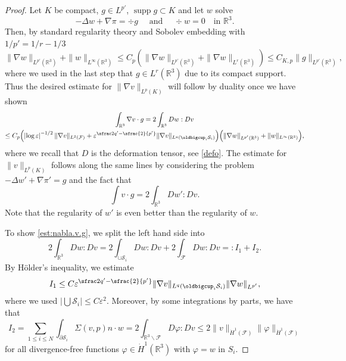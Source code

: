 \documentclass[JEP,XML,SOM,Unicode, NoEqCountersInSection,NoFloatCountersInSection,published]{cedram}
\newcommand{\R}{\mathbb{R}}
\let\eps\varepsilon
\newcommand{\cS}{\mathcal{S}}
\DeclareMathOperator{\supp}{supp}
\theoremstyle{definition}
\theoremstyle{remark}
\begin{document}
\begin{proof}

Let $K$ be compact, $g \in L^{p'}$, $\supp g \subset K$ and let $w$ solve
\begin{equation*}
- \Delta w + \nabla \pi = \div g \quad \text{ and } \quad \div w = 0 \quad \text{in } \R^3.
\end{equation*}
Then, by standard regularity theory and Sobolev embedding with $1/{p'} = 1/r - 1/3$
\begin{equation}
\|\nabla w\|_{L^{p'}(\R^3)} + \|w\|_{L^\infty(\R^3)} \leq C_p (\|\nabla w\|_{L^{p'}(\R^3)} + \|\nabla w\|_{L^{r}(\R^3)}) \leq C_{K,p}\|g\|_{L^{p'}(\R^3)},
\end{equation}
where we used in the last step that $g \in L^r(\R^3)$ due to its compact support.
Thus the desired estimate for $\|\nabla v\|_{L^p(K)}$ will follow by duality once we have shown
\begin{multline} \label{est:nabla.v.g}
\int_{\R^3} \nabla v \cdot g
= 2 \int_{\R^3} D w : D v \\
\leq C_p \Bigl(\left|\log \eps\right|^{-1/2} \|\nabla v\|_{L^2(\mathcal F)} + {\eps^{\sfrac 2 {q'} - \sfrac{2}{p'}} \|\nabla v\|_{L^q(\oldbigcup_i \cS_i)}}\Bigr)
\Bigl(\|\nabla w\|_{L^{p'}(\R^3)} + \|w\|_{L^\infty(\R^3)} \Bigr),
\end{multline}
where we recall that $D$ is the deformation tensor, see \eqref{defo}.
The estimate for $\|v\|_{L^p(K)}$ follows along the same lines by considering the problem $- \Delta w' + \nabla \pi' = g$ and the fact that
\begin{equation*}
\int v \cdot g = 2 \int_{\R^3} D w' : D v.
\end{equation*}
Note that the regularity of $w'$ is even better than the regularity of $w$.

To show \eqref{est:nabla.v.g}, we split the left hand side into
\begin{equation}
2 \int_{\R^3} D w : D v = 2 \int_{\cup \mathcal S_i} D w : D v + 2 \int_{\mathcal F} D w : D v =:I_1 + I_2.
\end{equation}
By Hölder's inequality, we estimate
\begin{equation}
I_1 \leq C {\eps^{\sfrac 2 {q'} - \sfrac{2}{p'}} \|\nabla v\|_{L^q(\oldbigcup_i \cS_i)}} \|\nabla w\|_{L^{p'}},
\end{equation}
where we used $|\bigcup \mathcal S_i| \leq C \eps^2$.
Moreover, by some integrations by parts, we have that
\begin{equation}
I_2 = \sum_{1 \leq i \leq N} \int_{\partial \mathcal S_i} \Sigma(v,p) n \cdot w = 2 \int_{\R^3 \smallsetminus \mathcal F} D \varphi : D v
\leq 2 \|v\|_{\dot H^1(\mathcal F)} \|\varphi\|_{\dot H^1(\mathcal F)}
\end{equation}
for all divergence-free functions $\varphi \in \dot H^1(\R^3)$ with $\varphi = w$ in $S_i$.


\end{proof}
\end{document}
